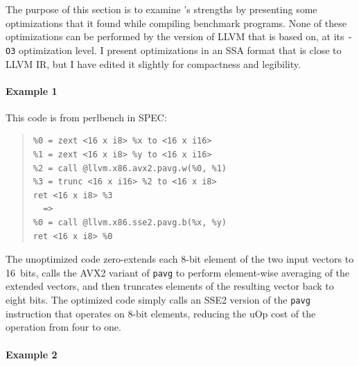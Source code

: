The purpose of this section is to examine \minotaur's strengths by
presenting some optimizations that it found while compiling benchmark
programs.
%
None of these optimizations can be performed by the version of LLVM
that \minotaur{} is based on,
at its \texttt{-O3} optimization level.
%
I present optimizations in an SSA format that is close to LLVM IR,
but I have edited it slightly for compactness and legibility.

\paragraph*{Example 1}

This code is from perlbench in SPEC:

{\begin{quote}\begin{verbatim}
%0 = zext <16 x i8> %x to <16 x i16>
%1 = zext <16 x i8> %y to <16 x i16>
%2 = call @llvm.x86.avx2.pavg.w(%0, %1)
%3 = trunc <16 x i16> %2 to <16 x i8>
ret <16 x i8> %3
  =>
%0 = call @llvm.x86.sse2.pavg.b(%x, %y)
ret <16 x i8> %0
\end{verbatim}
\end{quote}}

The unoptimized code zero-extends each 8-bit element of the two input
vectors to 16~bits, calls the AVX2 variant of \texttt{pavg} to perform
element-wise averaging of the extended vectors, and then truncates
elements of the resulting vector back to eight bits.
%
The optimized code simply calls an SSE2 version of the \texttt{pavg}
instruction that operates on 8-bit elements, reducing the uOp cost
of the operation from four to one.


\paragraph*{Example 2}

